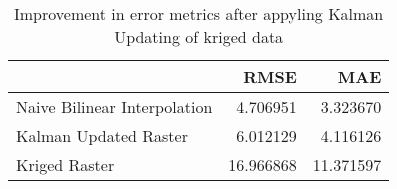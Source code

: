 \begin{table}
\caption{Improvement in error metrics after appyling Kalman Updating of kriged data}
\label{tab:oahu8_lidar_error}
\begin{tabular}{lrr}
\toprule
 & RMSE & MAE \\
\midrule
Naive Bilinear Interpolation & 4.706951 & 3.323670 \\
Kalman Updated Raster & 6.012129 & 4.116126 \\
Kriged Raster & 16.966868 & 11.371597 \\
\bottomrule
\end{tabular}
\end{table}
